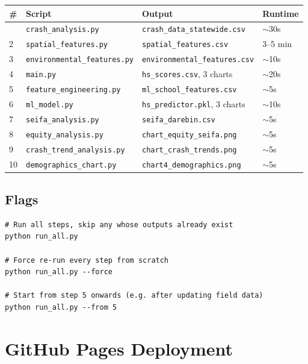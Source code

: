 \documentclass[11pt,a4paper,openany]{book}
\begin{document}
\begin{center}
\begin{longtable}{C{0.5cm}L{4.5cm}L{5cm}L{2.5cm}}
\toprule
\textbf{\#} & \textbf{Script} & \textbf{Output} & \textbf{Runtime} \\
\midrule
\endhead
\bottomrule
{}  & \texttt{crash\_analysis.py}         & \texttt{crash\_data\_statewide.csv}      & $\sim$30s \\
2  & \texttt{spatial\_features.py}       & \texttt{spatial\_features.csv}           & 3--5 min \\
3  & \texttt{environmental\_features.py} & \texttt{environmental\_features.csv}     & $\sim$10s \\
4  & \texttt{main.py}                    & \texttt{hs\_scores.csv}, 3 charts        & $\sim$20s \\
5  & \texttt{feature\_engineering.py}    & \texttt{ml\_school\_features.csv}        & $\sim$5s  \\
6  & \texttt{ml\_model.py}               & \texttt{hs\_predictor.pkl}, 3 charts     & $\sim$10s \\
7  & \texttt{seifa\_analysis.py}         & \texttt{seifa\_darebin.csv}              & $\sim$5s  \\
8  & \texttt{equity\_analysis.py}        & \texttt{chart\_equity\_seifa.png}        & $\sim$5s  \\
9  & \texttt{crash\_trend\_analysis.py}  & \texttt{chart\_crash\_trends.png}        & $\sim$5s  \\
10 & \texttt{demographics\_chart.py}     & \texttt{chart4\_demographics.png}        & $\sim$5s  \\
\end{longtable}
\end{center}

\subsection{Flags}

\begin{lstlisting}[style=bash, caption={run\_all.py usage.}]
# Run all steps, skip any whose outputs already exist
python run_all.py

# Force re-run every step from scratch
python run_all.py --force

# Start from step 5 onwards (e.g. after updating field data)
python run_all.py --from 5
\end{lstlisting}

\section{GitHub Pages Deployment}
\end{document}
